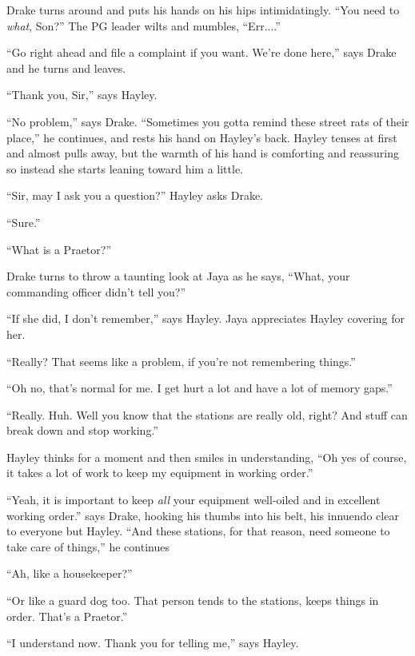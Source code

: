 Drake turns around and puts his hands on his hips intimidatingly.  ``You need to \textit{what}, Son?''  The PG leader wilts and mumbles, ``Err....''

``Go right ahead and file a complaint if you want.  We're done here,'' says Drake and he turns and leaves.

``Thank you, Sir,'' says Hayley.

``No problem,'' says Drake.  ``Sometimes you gotta remind these street rats of their place,'' he continues, and rests his hand on Hayley's back.  Hayley tenses at first and almost pulls away, but the warmth of his hand is comforting and reassuring so instead she starts leaning toward him a little.

``Sir, may I ask you a question?'' Hayley asks Drake.

``Sure.''

``What is a Praetor?''

Drake turns to throw a taunting look at Jaya as he says, ``What, your commanding officer didn't tell you?''

``If she did, I don't remember,'' says Hayley.  Jaya appreciates Hayley covering for her.

``Really?  That seems like a problem, if you're not remembering things.''

``Oh no, that's normal for me.  I get hurt a lot and have a lot of memory gaps.''

``Really.  Huh.  Well you know that the stations are really old, right?  And stuff can break down and stop working.''

Hayley thinks for a moment and then smiles in understanding, ``Oh yes of course, it takes a lot of work to keep my equipment in working order.''

``Yeah, it is important to keep \textit{all} your equipment well-oiled and in excellent working order.'' says Drake, hooking his thumbs into his belt, his innuendo clear to everyone but Hayley.  ``And  these stations, for that reason, need someone to take care of things,'' he continues

``Ah, like a housekeeper?''

``Or like a guard dog too. That person tends to the stations, keeps things in order.  That's a Praetor.''

``I understand now.  Thank you for telling me,'' says Hayley.


